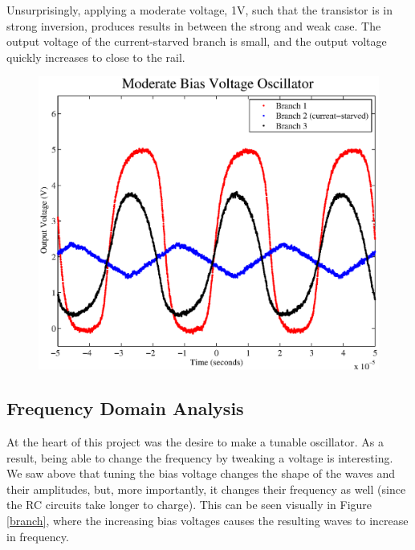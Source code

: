 \documentclass{article}
\begin{document}
Unsurprisingly, applying a moderate voltage, 1V, such that the transistor is in strong inversion, produces results in between the strong and weak case.  The output voltage of the current-starved branch is small, and the output voltage quickly increases to close to the rail.

\begin{figure}[H]
\centering
\includegraphics[scale=.6]{moderate_bias.eps}
\caption{}
\label{moderateBias}
\end{figure}

\subsection*{Frequency Domain Analysis}

At the heart of this project was the desire to make a tunable oscillator. As a result, being able to change the frequency by tweaking a voltage is interesting.  We saw above that tuning the bias voltage changes the shape of the waves and their amplitudes, but, more importantly, it changes their frequency as well (since the RC circuits take longer to charge).  This can be seen visually in Figure \ref{branch}, where the increasing bias voltages causes the resulting waves to increase in frequency.
\end{document}
